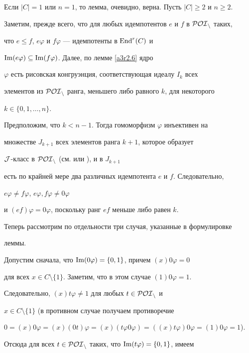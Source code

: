 \begin{pf}


Если $|C|=1$ или $n=1$, то лемма, очевидно, верна. Пусть $|C|\ge2$ и $n\ge2$.


Заметим, прежде всего, что для любых идемпотентов $e$ и $f$ в $\cal{POI}_n$ таких,


что $e\le f$, $e\varphi$ и $f\varphi$ --- идемпотенты в $\operatorname{End}^r(C)$ и


$\operatorname{Im}(e\varphi)\subseteq\operatorname{Im}(f\varphi)$. Далее, по лемме \ref{a3r2.6} ядро


$\varphi$ есть рисовская конгруэнция, соответствующая идеалу $I_k$ всех


элементов из $\cal{POI}_n$ ранга, меньшего либо равного $k$, для некоторого


$k\in\{0,1,\dotsc,n\}$.





Предположим, что $k<n-1$. Тогда гомоморфизм $\varphi$ инъективен на


множестве $J_{k+1}$ всех элементов ранга $k+1$, которое образует


$\cal J$-класс в $\cal{POI}_n$ (см. \cite{VHF1} или \cite{VHF3}), и в $J_{k+1}$


есть по крайней мере два различных идемпотента $e$ и $f$. Следовательно,


$e\varphi\neq f\varphi$, $e\varphi,f\varphi\neq0\varphi$


и $(ef)\varphi=0\varphi$, поскольку ранг $ef$ меньше либо равен $k$.





Теперь рассмотрим по отдельности три случая, указанные в формулировке


леммы.





Допустим сначала, что $\operatorname{Im}(0\varphi)=\{0,1\}$, причем $(x)0\varphi=0$


для всех $x\in C\setminus\{1\}$. Заметим, что в этом случае $(1)0\varphi=1$.


Следовательно, $(x)t\varphi\neq1$ для любых $t\in\cal{POI}_n$ и


$x\in C\setminus\{1\}$ (в противном случае получаем противоречие


$0=(x)0\varphi=(x)(0t)\varphi=(x)(t\varphi0\varphi)=((x)t\varphi)0\varphi


=(1)0\varphi=1$).


Отсюда для всех $t\in\cal{POI}_n$ таких, что $\operatorname{Im}(t\varphi)=\{0,1\}$, имеем



\end{pf}
